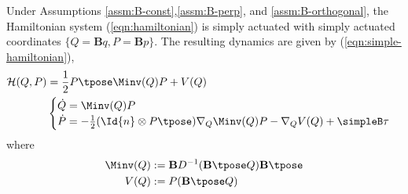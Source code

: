 \begin{thm}\label{thm:simply-actuated}
    Under Assumptions \ref{assm:B-const},\ref{assm:B-perp}, and
    \ref{assm:B-orthogonal}, the Hamiltonian system (\ref{eqn:hamiltonian}) is
    simply actuated with simply actuated coordinates 
    \(\{Q = \mathbf{B}q, P = \mathbf{B}p\}\). The resulting dynamics are 
    given by (\ref{eqn:simple-hamiltonian}),
    \begin{align}\label{eqn:simple-hamiltonian}
        \mathcal{H}(Q,P) &= 
        \frac{1}{2} P\tpose \Minv(Q) P + V(Q) \\
       &\begin{cases}
            \dot{Q} = \Minv(Q)P \\
            \dot{P} = -\frac{1}{2} (\Id{n} \otimes P\tpose) \nabla_Q \Minv(Q) P
                - \nabla_Q V(Q) + \simpleB \tau
        \end{cases} \nonumber
    \end{align}
    where
    \begin{align*}
        \Minv(Q) &:= \mathbf{B}D^{-1}(\mathbf{B}\tpose Q)\mathbf{B}\tpose \\
        V(Q) &:= P(\mathbf{B}\tpose Q) \\
    \end{align*}
\end{thm}
\vspace{-4.5em} %
